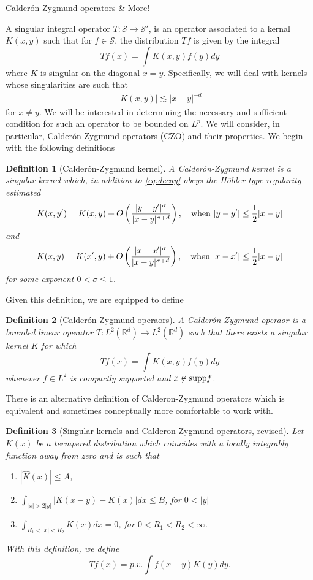 \documentclass[11pt]{article}
\newtheorem*{defn}{Definition}
\theoremstyle{remark}
\newcommand{\calS}{\mathcal{S}}
\newcommand{\1}{\textbf{1}}
\newcommand{\lle}{\lesssim}
\newcommand{\bbR}{\mathbb{R}}
\begin{document}
\newpage
{\noindent\Large Calder\'on-Zygmund operators \& More! }
\vspace{6mm}

A singular integral operator $T : \calS \to \calS'$, is an operator associated to a kernal $K(x,y)$ such that for $f \in \calS$, the distribution $Tf$ is given by the integral
\[
Tf(x) = \int K(x,y) f(y) dy
\]
where $K$ is singular on the diagonal $x = y$. Specifically, we will deal with kernels whose singularities are such that
\begin{align}
|K(x,y)| \lle |x-y|^{-d}
\label{eq:decay}
\end{align}
for $x \neq y$. We will be interested in determining the necessary and sufficient condition for such an operator to be bounded on $L^p$. We will consider, in particular, Calder\'on-Zygmund operators (CZO) and their properties. We begin with the following definitions
\begin{defn}[Calder\'on-Zygmund kernel]
A Calder\'on-Zygmund kernel is a singular kernel which, in addition to \eqref{eq:decay} obeys the H\"older type regularity estimated
\[
K(x,y') = K(x,y) + O \left( \frac{|y-y'|^\sigma}{|x-y|^{\sigma+d}} \right), \quad \textup{when } |y-y'| \leq \frac{1}{2} |x-y|
\]
and
\[
K(x,y) = K(x',y) + O \left( \frac{|x-x'|^\sigma}{|x-y|^{\sigma+d}} \right), \quad \textup{when } |x-x'| \leq \frac{1}{2} |x-y|
\]
for some exponent $0 < \sigma \leq 1$.
\end{defn}
Given this definition, we are equipped to define
\begin{defn}[Calder\'on-Zygmund operaors]
A Calder\'on-Zygmund operaor is a bounded linear operator $T : L^2(\bbR^d) \to L^2(\bbR^d)$ such that there exists a singular kernel $K$ for which
\[
Tf(x) = \int K(x,y) f(y) dy
\]
whenever $f \in L^2$ is compactly supported and $x \not\in \textup{supp} f$.
\end{defn}
There is an alternative definition of Calderon-Zygmund operators which is equivalent and sometimes conceptually more comfortable to work with.
\begin{defn}[Singular kernels and Calderon-Zygmund operators, revised]
Let $K(x)$ be a termpered distribution which coincides with a locally integrably function away from zero and is such that
\begin{enumerate}
\item $|\hat{K}(x)| \leq A$,
\item $\int_{|x| > 2|y|} |K(x-y) - K(x)| dx \leq B$, for $0 < |y|$
\item $\int_{R_1 < |x| < R_2} K(x) dx = 0$, for $0 < R_1 < R_2 < \infty$. 
\end{enumerate}
With this definition, we define 
\[
Tf (x) = p.v. \int f(x-y) K(y) dy.
\]
\end{defn}
\end{document}
